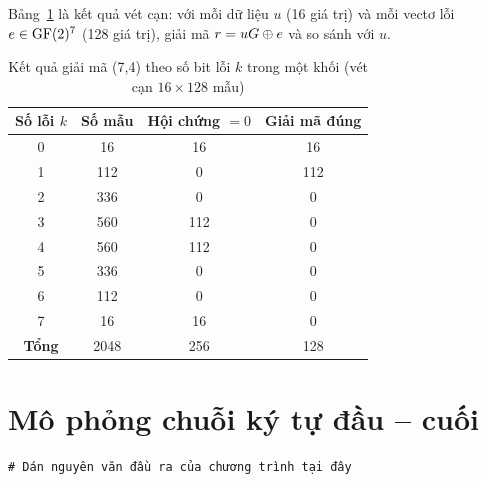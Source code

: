 Bảng~\ref{tab:theosoloi} là kết quả vét cạn: với mỗi dữ liệu $u$ (16 giá trị)
và mỗi vectơ lỗi $e \in \mathrm{GF}(2)^{7}$ (128 giá trị), giải mã $r = uG \oplus e$ và so
sánh với $u$.

\begin{table}[H]
\centering
\caption{Kết quả giải mã (7,4) theo số bit lỗi $k$ trong một khối (vét cạn $16 \times 128$ mẫu)}
\label{tab:theosoloi}
\begin{tabular}{|c|c|c|c|}
\hline
\textbf{Số lỗi $k$} & \textbf{Số mẫu} & \textbf{Hội chứng $= 0$} &
\textbf{Giải mã đúng}\\ \hline
0 & 16  & 16  & 16\\
1 & 112 & 0   & 112\\
2 & 336 & 0   & 0\\
3 & 560 & 112 & 0\\
4 & 560 & 112 & 0\\
5 & 336 & 0   & 0\\
6 & 112 & 0   & 0\\
7 & 16  & 16  & 0\\ \hline
\textbf{Tổng} & 2048 & 256 & 128\\ \hline
\end{tabular}
\end{table}


\section{Mô phỏng chuỗi ký tự đầu -- cuối}
\label{sec:5.3}


\begin{center}
\begin{minipage}{\linewidth}
\label{lst:ketqua53}
\end{minipage}
\end{center}
\begin{Verbatim}
# Dán nguyên văn đầu ra của chương trình tại đây
\end{Verbatim}

